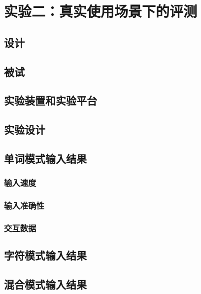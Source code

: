 \chapter{实验二：真实使用场景下的评测} %
\label{cha:evaluation}
\section{设计}
\section{被试}
\section{实验装置和实验平台}
\section{实验设计}
\section{单词模式输入结果}
\subsection{输入速度}
\subsection{输入准确性}
\subsection{交互数据}
\section{字符模式输入结果}
\section{混合模式输入结果}